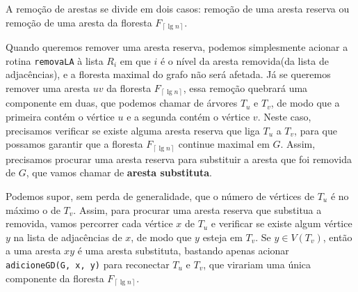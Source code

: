 A remoção de arestas se divide em dois casos: remoção de uma aresta reserva ou remoção de uma aresta da floresta $F_{\left\lceil \lg n \right\rceil}$.

Quando queremos remover uma aresta reserva, podemos simplesmente acionar a rotina \texttt{removaLA} à lista $R_i$ em que $i$ é o nível da aresta removida(da lista de adjacências), e a floresta maximal do grafo não será afetada. Já se queremos remover uma aresta $uv$ da floresta $F_{\left\lceil \lg n \right\rceil}$, essa remoção quebrará uma componente em duas, que podemos chamar de árvores $T_u$ e $T_v$, de modo que a primeira contém o vértice $u$ e a segunda contém o vértice $v$. Neste caso, precisamos verificar se existe alguma aresta reserva que liga $T_u$ a $T_v$, para que possamos garantir que a floresta $F_{\left\lceil \lg n \right\rceil} $ continue maximal em $G$. Assim, precisamos procurar uma aresta reserva para substituir a aresta que foi removida de $G$, que vamos chamar de \textbf{aresta substituta}.

Podemos supor, sem perda de generalidade, que o número de vértices de $T_u$ é no máximo o de $T_v$. Assim, para procurar uma aresta reserva que substitua a removida, vamos percorrer cada vértice $x$ de $T_u$ e verificar se existe algum vértice $y$ na lista de adjacências de $x$, de modo que $y$ esteja em $T_v$. Se $y \in V(T_v)$, então a uma aresta $xy$ é uma aresta substituta, bastando apenas acionar \texttt{adicioneGD(G, x, y)} para reconectar $T_u$ e $T_v$, que virariam uma única componente da floresta $F_{\left\lceil \lg n \right\rceil}$.

